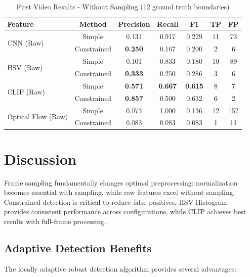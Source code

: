 \documentclass[11pt,a4paper]{article}
\begin{document}
\begin{table}[H]
\centering
\caption{First Video Results - Without Sampling (12 ground truth boundaries)}
\label{tab:first_video_no_sampling}
\small
\begin{tabular}{lcccccc}
\toprule
\textbf{Feature} & \textbf{Method} & \textbf{Precision} & \textbf{Recall} & \textbf{F1} & \textbf{TP} & \textbf{FP} \\
\midrule
\multirow{2}{*}{CNN (Raw)} & Simple & 0.131 & 0.917 & 0.229 & 11 & 73 \\
                           & Constrained & \textbf{0.250} & 0.167 & 0.200 & 2 & 6 \\
\midrule
\multirow{2}{*}{HSV (Raw)} & Simple & 0.101 & 0.833 & 0.180 & 10 & 89 \\
                           & Constrained & \textbf{0.333} & 0.250 & 0.286 & 3 & 6 \\
\midrule
\multirow{2}{*}{CLIP (Raw)} & Simple & \textbf{0.571} & \textbf{0.667} & \textbf{0.615} & 8 & 7 \\
                            & Constrained & \textbf{0.857} & 0.500 & 0.632 & 6 & 2 \\
\midrule
\multirow{2}{*}{Optical Flow (Raw)} & Simple & 0.073 & 1.000 & 0.136 & 12 & 152 \\
                                    & Constrained & 0.083 & 0.083 & 0.083 & 1 & 11 \\
\bottomrule
\end{tabular}
\end{table}

\section{Discussion}

Frame sampling fundamentally changes optimal preprocessing: normalization becomes essential with sampling, while raw features excel without sampling. Constrained detection is critical to reduce false positives. HSV Histogram provides consistent performance across configurations, while CLIP achieves best results with full-frame processing.

\subsection{Adaptive Detection Benefits}

The locally adaptive robust detection algorithm provides several advantages:
\end{document}
